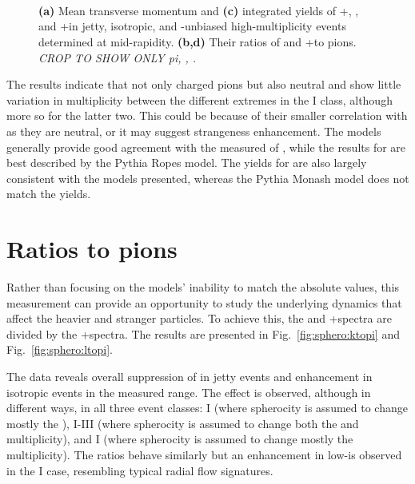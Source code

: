 \begin{figure}[H]
\\
\\
\\
\caption{\textbf{(a)} Mean transverse momentum and \textbf{(c)} integrated yields of \pip+\pim, \KOs, and \LA+\AL in jetty, isotropic, and \SOPT-unbiased high-multiplicity events determined at mid-rapidity. \textbf{(b,d)} Their ratios of \KOs and \LA+\AL to pions. \textit{CROP TO SHOW ONLY pi, \KOs, \LA.}}
\label{fig:sphero:meanpt}
\end{figure}

The results indicate that not only charged pions but also neutral \KOs and \LA show little variation in multiplicity between the different \SOPT extremes in the \NSPD I class, although more so for the latter two. This could be because of their smaller correlation with \SOPT as they are neutral, or it may suggest strangeness enhancement. The models generally provide good agreement with the measured \meanpt of \KOs, while the results for \LA are best described by the Pythia Ropes model. The yields for \KOs are also largely consistent with the models presented, whereas the Pythia Monash model does not match the \LA yields.

\section{Ratios to pions}

Rather than focusing on the models' inability to match the absolute values, this measurement can provide an opportunity to study the underlying dynamics that affect the heavier and stranger particles. To achieve this, the \KOs and \LA+\AL \pt spectra are divided by the \pip+\pim spectra. The results are presented in Fig.~\ref{fig:sphero:ktopi} and Fig.~\ref{fig:sphero:ltopi}.

The data reveals overall suppression of \KOs in jetty events and enhancement in isotropic events in the measured \pt range. The effect is observed, although in different ways, in all three event classes: \NSPD I (where spherocity is assumed to change mostly the \meanpt), \NSPD I-III (where spherocity is assumed to change both the \meanpt and multiplicity), and \VOM I (where spherocity is assumed to change mostly the multiplicity). The \LA ratios behave similarly but an enhancement in low-\pt is observed in the \VOM I case, resembling typical radial flow signatures.


